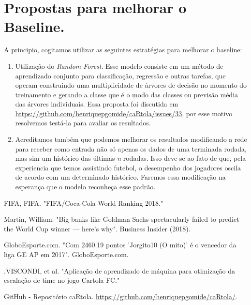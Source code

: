 \documentclass[conference]{IEEEtran}
\begin{document}
\section{Propostas para melhorar o Baseline.}
A principio, cogitamos utilizar as seguintes estratégias para melhorar o baseline:

\begin{enumerate}
	\item Utilização do \textit{Random Forest}. Esse modelo consiste em um método de aprendizado conjunto para classificação, regressão e outras tarefas, que operam construindo uma multiplicidade de árvores de decisão no momento do treinamento e gerando a classe que é o modo das classes ou previsão média das árvores individuais. Essa proposta foi discutida em \url{https://github.com/henriquepgomide/caRtola/issues/33}, por esse motivo resolvemos testá-la para avaliar os resultados.
	\item Acreditamos também que podemos melhorar os resultados modificando a rede para receber como entrada não só apenas os dados de uma terminada rodada, mas sim um histórico das últimas \textit{n} rodadas. Isso deve-se ao fato de que, pela experiencia que temos assistindo futebol, o desempenho dos jogadores oscila de acordo com um determinado histórico. Faremos essa modificação na esperança que o modelo reconheça esse padrão.
\end{enumerate}




\begin{thebibliography}{00}

 FIFA, FIFA. "FIFA/Coca-Cola World Ranking 2018."

  Martin,   William.  "Big  banks  like   Goldman  Sachs
spectacularly failed to predict the  World Cup winner — here's why".
Business Insider (2018).

 GloboEsporte.com. "Com 2460.19 pontos 'Jorgito10
(O mito)' é o vencedor da liga GE AP em 2017". GloboEsporte.com.

   .VISCONDI,   et  al.   "Aplicação   de
aprendizado de  máquina para otimização  da escalação de  time no
jogo Cartola FC."

      GitHub     -      Repositório     caRtola.
\url{https://github.com/henriquepgomide/caRtola/}.

\end{thebibliography}
\end{document}
